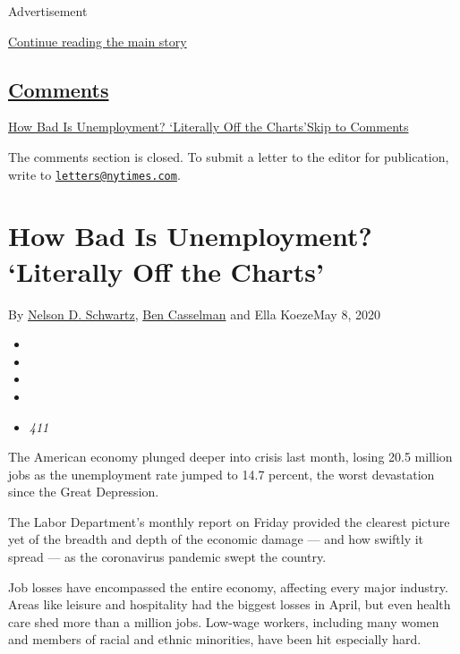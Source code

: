 Advertisement

\protect\hyperlink{after-top}{Continue reading the main story}

\hypertarget{comments}{%
\subsection{\texorpdfstring{\protect\hyperlink{commentsContainer}{Comments}}{Comments}}\label{comments}}

\href{}{How Bad Is Unemployment? `Literally Off the Charts'}\href{}{Skip
to Comments}

The comments section is closed. To submit a letter to the editor for
publication, write to
\href{mailto:letters@nytimes.com}{\nolinkurl{letters@nytimes.com}}.

\hypertarget{how-bad-is-unemployment-literally-off-the-charts}{%
\section{How Bad Is Unemployment? `Literally Off the
Charts'}\label{how-bad-is-unemployment-literally-off-the-charts}}

By \href{https://www.nytimes.com/by/nelson-d-schwartz}{Nelson D.
Schwartz}, \href{https://www.nytimes.com/by/ben-casselman}{Ben
Casselman} and Ella KoezeMay 8, 2020

\begin{itemize}
\item
\item
\item
\item
\item
  \emph{411}
\end{itemize}

The American economy plunged deeper into crisis last month, losing 20.5
million jobs as the unemployment rate jumped to 14.7 percent, the worst
devastation since the Great Depression.

The Labor Department's monthly report on Friday provided the clearest
picture yet of the breadth and depth of the economic damage --- and how
swiftly it spread --- as the coronavirus pandemic swept the country.

Job losses have encompassed the entire economy, affecting every major
industry. Areas like leisure and hospitality had the biggest losses in
April, but even health care shed more than a million jobs. Low-wage
workers, including many women and members of racial and ethnic
minorities, have been hit especially hard.

